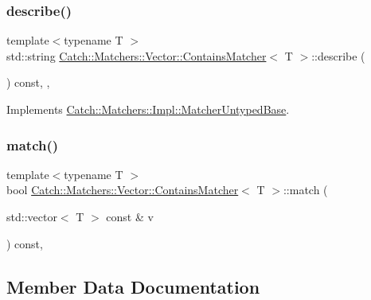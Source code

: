 \subsubsection{\texorpdfstring{describe()}{describe()}}
{\footnotesize\ttfamily template$<$typename T $>$ \\
std\+::string \mbox{\hyperlink{structCatch_1_1Matchers_1_1Vector_1_1ContainsMatcher}{Catch\+::\+Matchers\+::\+Vector\+::\+Contains\+Matcher}}$<$ T $>$\+::describe (\begin{DoxyParamCaption}{ }\end{DoxyParamCaption}) const\hspace{0.3cm}{\ttfamily [inline]}, {\ttfamily [override]}, {\ttfamily [virtual]}}



Implements \mbox{\hyperlink{classCatch_1_1Matchers_1_1Impl_1_1MatcherUntypedBase_a91d3a907dbfcbb596077df24f6e11fe2}{Catch\+::\+Matchers\+::\+Impl\+::\+Matcher\+Untyped\+Base}}.

\mbox{\label{structCatch_1_1Matchers_1_1Vector_1_1ContainsMatcher_afd33467ae48a41a634572b41b053f67f}} 
\subsubsection{\texorpdfstring{match()}{match()}}
{\footnotesize\ttfamily template$<$typename T $>$ \\
bool \mbox{\hyperlink{structCatch_1_1Matchers_1_1Vector_1_1ContainsMatcher}{Catch\+::\+Matchers\+::\+Vector\+::\+Contains\+Matcher}}$<$ T $>$\+::match (\begin{DoxyParamCaption}\item[{std\+::vector$<$ T $>$ const \&}]{v }\end{DoxyParamCaption}) const\hspace{0.3cm}{\ttfamily [inline]}, {\ttfamily [override]}}



\subsection{Member Data Documentation}
\mbox{\label{structCatch_1_1Matchers_1_1Vector_1_1ContainsMatcher_a83d051166e4ed0d535219ad6ee99abb2}} 
